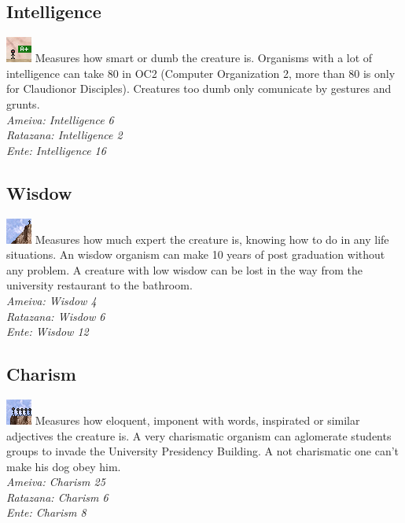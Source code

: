 \documentclass[ letterpaper,12pt]{article}
\begin{document}
\subsection{Intelligence}
\includegraphics{../data/skills/Img/inteligencia.png}
Measures how smart or dumb the creature is. Organisms with a lot of
intelligence can take 80 in OC2 (Computer Organization 2, more than 80 is only
for Claudionor Disciples). Creatures too dumb only comunicate by gestures and
grunts.\\
{\it Ameiva: Intelligence 6\\
Ratazana: Intelligence 2\\
Ente: Intelligence 16\\}

\subsection{Wisdow}
\includegraphics{../data/skills/Img/sabedoria.png}
Measures how much expert the creature is, knowing how to do in any life
situations. An wisdow organism can make 10 years of post graduation without any
problem. A creature with low wisdow can be lost in the way from the university
restaurant to the bathroom.\\ 
{\it Ameiva: Wisdow 4\\
Ratazana: Wisdow 6\\
Ente: Wisdow 12}

\subsection{Charism}
\includegraphics{../data/skills/Img/carisma.png}
Measures how eloquent, imponent with words, inspirated or similar adjectives
the creature is. A very charismatic organism can aglomerate students groups to
invade the University Presidency Building. A not charismatic one can't make his
dog obey him.\\
{\it Ameiva: Charism 25\\
Ratazana: Charism 6\\
Ente: Charism 8}
\end{document}
